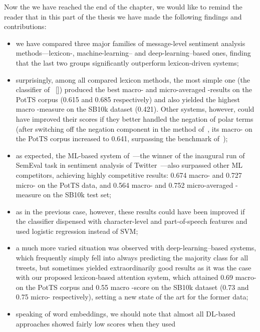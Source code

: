 Now the we have reached the end of the chapter, we would like to
remind the reader that in this part of the thesis we have made the
following findings and contributions:
\begin{itemize}
  \item we have compared three major families of message-level
    sentiment analysis methods---lexicon-, machine-learning-- and
    deep-learning--based ones, finding that the last two groups
    significantly outperform lexicon-driven systems;
  \item surprisingly, among all compared lexicon methods, the most
    simple one (the classifier of~\citeauthor{Hu:04}
    [\citeyear{Hu:04}]) produced the best macro- and micro-averaged
    \F{}-results on the PotTS corpus (0.615 and 0.685 respectively)
    and also yielded the highest macro \F{}-measure on the SB10k
    dataset (0.421).  Other systems, however, could have improved
    their scores if they better handled the negation of polar terms
    (after switching off the negation component in the method
    of~\citeauthor{Musto:14}, its macro-\F{} on the PotTS corpus
    increased to 0.641, surpassing the benchmark
    of~\citeauthor{Hu:04});
  \item as expected, the ML-based system of~\citet{Mohammad:13}---the
    winner of the inaugural run of SemEval task in sentiment analysis
    of Twitter~\cite{Nakov:13}---also surpassed other ML competitors,
    achieving highly competitive results: 0.674 macro- and 0.727
    micro-\F{} on the PotTS data, and 0.564 macro- and 0.752
    micro-averaged \F{}-measure on the SB10k test set;
  \item as in the previous case, however, these results could have
    been improved if the classifier dispensed with character-level and
    part-of-speech features and used logistic regression instead of
    SVM;
  \item a much more varied situation was observed with
    deep-learning--based systems, which frequently simply fell into
    always predicting the majority class for all tweets, but sometimes
    yielded extraordinarily good results as it was the case with our
    proposed lexicon-based attention system, which attained 0.69
    macro-\F{} on the PotTS corpus and 0.55 macro \F{}-score on the
    SB10k dataset (0.73 and 0.75 micro-\F{} respectively), setting a
    new state of the art for the former data;
  \item speaking of word embeddings, we should note that almost all
    DL-based approaches showed fairly low scores when they used

\end{itemize}
